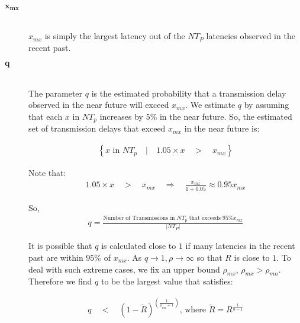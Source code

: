         \begin{description}
        \item[\Huge$\boldsymbol{x_{mx}}$] \hfill \\
        $x_{mx}$ is simply the largest latency out of the $NT_P$ latencies observed in the recent past.  

        \item[\Huge$\boldsymbol{q}$] \hfill \\
                The parameter $q$ is the estimated probability that a transmission delay observed in the near future will exceed $x_{mx}$.  We estimate $q$ by assuming that each $x$ in $NT_p$ increases by $5\%$ in the near future.  So, the estimated set of transmission delays that exceed $x_{mx}$ in the near future is:
                
        \begin{equation}
            \begin{aligned}
                \left\{ x \text{ in } NT_p \quad  | \quad 1.05 \times x \quad > \quad x_{mx} \right\}
            \end{aligned}
        \end{equation}
                
        Note that:
         \begin{equation}
            \begin{aligned}
                1.05 \times x \quad > \quad x_{mx} \quad \Rightarrow \quad \frac{x_{mx}}{1 + 0.05 } \approx 0.95 x_{mx}
            \end{aligned}
        \end{equation}
                
        So,
            \begin{equation}
            \begin{aligned}
                q  = \frac{\text{Number of Transmissions in } NT_p \text{ that exceeds } 95\% x_{mx}}{|NT_P|}
            \end{aligned}
        \end{equation}
        
                It is possible that $q$ is calculated close to $1$ if many latencies in the recent past are within $95\%$ of $x_{mx}$.  As $q \rightarrow 1, \rho \rightarrow \infty$ so that $R$ is close to $1$.  To deal with such extreme cases, we fix an upper bound $\rho_{mx}$, $\rho_{mx} > \rho_{mn}$.  Therefore we find $q$ to be the largest value that satisfies:
                
       \begin{equation}
            \begin{aligned}
                q \quad < \quad \left(1 - \tilde{R}\right)^{\left(\frac{1}{\rho_{mx} + 1} \right)} \text{, where } \tilde{R} = R^{\frac{1}{n-1}}
            \end{aligned}
        \end{equation}


\end{description}
